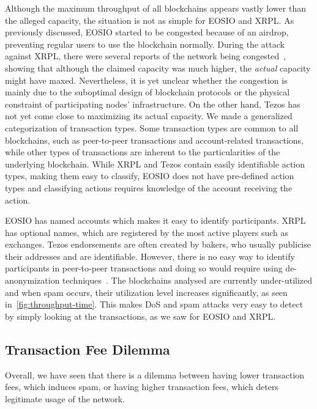 Although the maximum throughput of all blockchains appears vastly lower than the alleged capacity, the situation is not as simple for EOSIO and XRPL. As previously discussed, EOSIO started to be congested because of an airdrop, preventing regular users to use the blockchain normally.
During the attack against XRPL, there were several reports of the network being congested~\cite{AtoZMarkets2019, Tulo2019}, showing that although the claimed capacity was much higher, the {\em actual} capacity might have maxed. Nevertheless, it is yet unclear whether the congestion is mainly due to the suboptimal design of blockchain protocols or the physical constraint of participating nodes' infrastructure.
On the other hand, Tezos has not yet come close to maximizing its actual capacity.
We made a generalized categorization of transaction types.
Some transaction types are common to all blockchains, such as peer-to-peer transactions and account-related transactions, while other types of transactions are inherent to the particularities of the underlying blockchain. While XRPL and Tezos contain easily identifiable action types, making them easy to classify, EOSIO does not have pre-defined action types and classifying actions requires knowledge of the account receiving the action.

EOSIO has named accounts which makes it easy to identify participants.
XRPL has optional names, which are registered by the most active players such as exchanges.
Tezos endorsements are often created by bakers, who usually publicise their addresses and are identifiable. However, there is no easy way to identify participants in peer-to-peer transactions and doing so would require using de-anonymization techniques~\cite{10.1145/2660267.2660379,8802640}.
The blockchains analysed are currently under-utilized and when spam occurs, their utilization level increases significantly, as seen in~\autoref{fig:throughput-time}. This makes DoS and spam attacks very easy to detect by simply looking at the transactions, as we saw for EOSIO and XRPL.

\subsection{Transaction Fee Dilemma}
Overall, we have seen that there is a dilemma between having lower transaction fees, which induces spam, or having higher transaction fees, which deters legitimate usage of the network.

